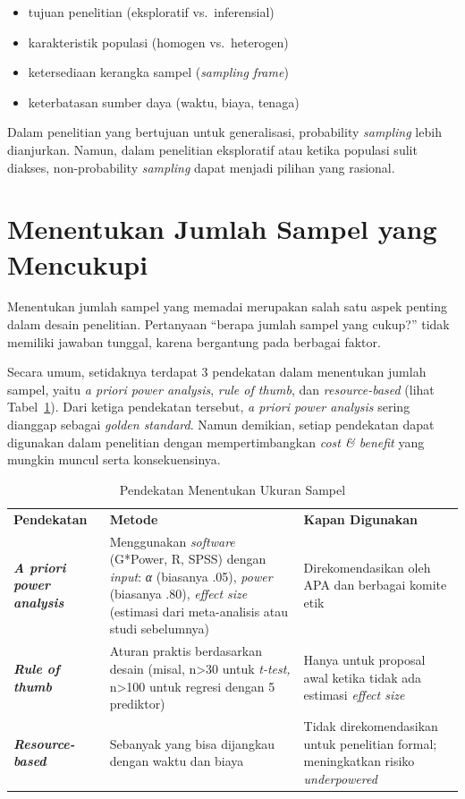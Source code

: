\documentclass[
  indonesian,
  letterpaper,
  DIV=11,
  numbers=noendperiod]{scrreprt}
\providecommand{\tightlist}{%
  \setlength{\itemsep}{0pt}\setlength{\parskip}{0pt}}
\begin{document}
\begin{itemize}
\tightlist
\item
  tujuan penelitian (eksploratif vs.~inferensial)
\item
  karakteristik populasi (homogen vs.~heterogen)
\item
  ketersediaan kerangka sampel (\emph{sampling frame})
\item
  keterbatasan sumber daya (waktu, biaya, tenaga)
\end{itemize}

Dalam penelitian yang bertujuan untuk generalisasi, probability
\emph{sampling} lebih dianjurkan. Namun, dalam penelitian eksploratif
atau ketika populasi sulit diakses, non-probability \emph{sampling}
dapat menjadi pilihan yang rasional.

\section{Menentukan Jumlah Sampel yang
Mencukupi}\label{menentukan-jumlah-sampel-yang-mencukupi}

Menentukan jumlah sampel yang memadai merupakan salah satu aspek penting
dalam desain penelitian. Pertanyaan ``berapa jumlah sampel yang cukup?''
tidak memiliki jawaban tunggal, karena bergantung pada berbagai faktor.

Secara umum, setidaknya terdapat 3 pendekatan dalam menentukan jumlah
sampel, yaitu \emph{a priori power analysis}, \emph{rule of thumb}, dan
\emph{resource-based} (lihat Tabel~\ref{tbl-samplesize}). Dari ketiga
pendekatan tersebut, \emph{a priori power analysis} sering dianggap
sebagai \emph{golden standard}. Namun demikian, setiap pendekatan dapat
digunakan dalam penelitian dengan mempertimbangkan \emph{cost \&
benefit} yang mungkin muncul serta konsekuensinya.

\begin{longtable}[]{@{}
  >{\raggedright\arraybackslash}p{}
  >{\raggedright\arraybackslash}p{}
  >{\raggedright\arraybackslash}p{}@{}}
\caption{Pendekatan Menentukan Ukuran
Sampel}\label{tbl-samplesize}\tabularnewline
\toprule\noalign{}
\endfirsthead
\endhead
\bottomrule\noalign{}
\endlastfoot
\textbf{Pendekatan} & \textbf{Metode} & \textbf{Kapan Digunakan} \\
\textbf{\emph{A priori power analysis}} & Menggunakan \emph{software}
(G*Power, R, SPSS) dengan \emph{input}: \emph{α} (biasanya .05),
\emph{power} (biasanya .80), \emph{effect size} (estimasi dari
meta-analisis atau studi sebelumnya) & Direkomendasikan oleh APA dan
berbagai komite etik \\
\textbf{\emph{Rule of thumb}} & Aturan praktis berdasarkan desain
(misal, n\textgreater30 untuk \emph{t-test,} n\textgreater100 untuk
regresi dengan 5 prediktor) & Hanya untuk proposal awal ketika tidak ada
estimasi \emph{effect size} \\
\textbf{\emph{Resource-based}} & Sebanyak yang bisa dijangkau dengan
waktu dan biaya & Tidak direkomendasikan untuk penelitian formal;
meningkatkan risiko \emph{underpowered} \\
\end{longtable}
\end{document}
